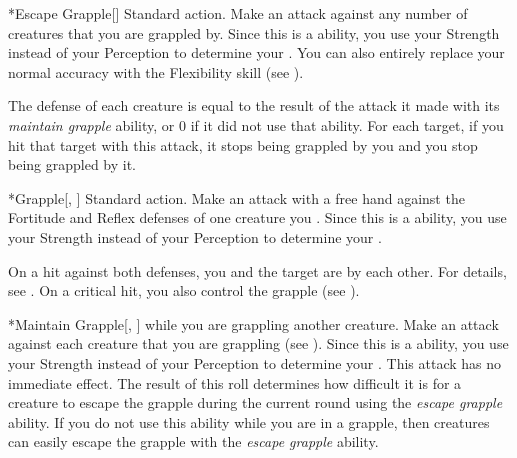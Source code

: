         \begin{activeability}*{Escape Grapple}[]
            \abilityusagetime Standard action.
            \rankline
            Make an attack against any number of creatures that you are grappled by.
            Since this is a  ability, you use your Strength instead of your Perception to determine your .
            You can also entirely replace your normal accuracy with the Flexibility skill (see ).

            The defense of each creature is equal to the result of the attack it made with its \textit{maintain grapple} ability, or 0 if it did not use that ability.
            For each target, if you hit that target with this attack, it stops being grappled by you and you stop being grappled by it.
        \end{activeability}

        \begin{activeability}*{Grapple}[, ]
            \abilityusagetime Standard action.
            \rankline
            Make an attack with a free hand against the Fortitude and Reflex defenses of one creature you .
            Since this is a  ability, you use your Strength instead of your Perception to determine your .

            On a hit against both defenses, you and the target are \grappled by each other.
            For details, see .
            On a critical hit, you also control the grapple (see ).
        \end{activeability}

        \begin{activeability}*{Maintain Grapple}[, ]
            \abilityusagetime {} while you are grappling another creature.
            \rankline
            Make an attack against each creature that you are grappling (see ).
            Since this is a  ability, you use your Strength instead of your Perception to determine your .
            This attack has no immediate effect.
            The result of this roll determines how difficult it is for a creature to escape the grapple during the current round using the \textit{escape grapple} ability.
            If you do not use this ability while you are in a grapple, then creatures can easily escape the grapple with the \textit{escape grapple} ability.
        \end{activeability}

